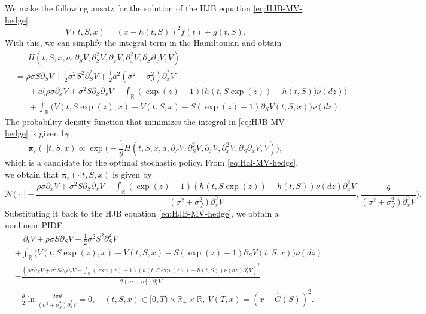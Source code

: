 \documentclass[11pt]{article}
\newcommand{\1}{\mathbbm{1}}
\newcommand{\bpi}{\boldsymbol{\pi}}
\begin{document}
We make the following ansatz for the solution of the HJB equation \eqref{eq:HJB-MV-hedge}:
\begin{equation}\label{eq:ansatz-MV-hedge}
	V(t,S,x)=(x-h(t,S))^2 f(t) + g(t,S).
\end{equation}
With this, we can simplify the integral term in the Hamiltonian and obtain
\begin{align}
	&\phantom{=~}H(t,S,x,a,\partial_SV,\partial_S^2V,\partial_xV,\partial_x^2V,\partial_S\partial_xV,V)\\
	&= \rho\sigma S \partial_SV + \frac{1}{2}\sigma^2S^2 \partial_S^2V + \frac{1}{2}a^2(\sigma^2+\sigma_J^2) \partial_x^2V \\
	&\phantom{=~}+ a\bigg(\rho\sigma \partial_xV + \sigma^2 S \partial_S\partial_xV - \int_{\mathbb{R}}(\exp(z)-1)\big(h(t,S\exp(z))-h(t,S)\big)\nu(dz)\bigg)\\
	&\phantom{=~}+\int_{\mathbb{R}} \big( V(t,S\exp(z),x) - V(t,S,x)- S(\exp(z)-1)\partial_SV(t,S,x)\big) \nu(dz).\label{eq:Hal-MV-hedge}
\end{align}
The probability density function that minimizes the integral in \eqref{eq:HJB-MV-hedge} is given by
\begin{equation}
	\bpi_c(\cdot|t,S,x)\propto \exp \bigg(-\frac{1}{\theta} H(t,S,x,a,\partial_SV,\partial_S^2V,\partial_xV,\partial_x^2V,\partial_S\partial_xV,V)\bigg),
\end{equation}
which is a candidate for the optimal stochastic policy.
From \eqref{eq:Hal-MV-hedge}, we obtain that $\bpi_c(\cdot|t,S,x)$ is given by
\begin{equation}
\mathcal{N}\bigg(\cdot\ \bigg| -\frac{\rho\sigma \partial_xV + \sigma^2 S \partial_S\partial_xV - \int_{\mathbb{R}}(\exp(z)-1)(h(t,S\exp(z))-h(t,S))\nu(dz)\partial_x^2V}{(\sigma^2+\sigma_J^2)\partial_x^2V}, \frac{\theta}{(\sigma^2+\sigma_J^2)\partial_x^2V}\bigg).
\end{equation}
Substituting it back to the HJB equation \eqref{eq:HJB-MV-hedge}, we obtain
a nonlinear PIDE
\begin{align}
	&\phantom{+~}\partial_tV + \rho\sigma S\partial_SV + \frac{1}{2}\sigma^2S^2\partial_S^2V\\
	&+ \int_{\mathbb{R}} \big( V(t,S\exp(z),x) - V(t,S,x)- S(\exp(z)-1)\partial_SV(t,S,x)\big) \nu(dz)\\
	&-\frac{(\rho\sigma \partial_XV + \sigma^2 S\partial_S\partial_xV-\int_{\mathbb{R}}(\exp(z)-1)(h(t,S\exp(z))-h(t,S))\nu(dz)\partial_x^2V)^2}{2(\sigma^2+\sigma_J^2)\partial_x^2V}\\
	&-\frac{\theta}{2}\ln\frac{2\pi\theta}{(\sigma^2+\sigma_J^2)\partial_x^2V}=0,\quad (t,S,x)\in[0,T)\times\mathbb{R}_+\times\mathbb{R},\ V(T,x)=(x-\hat{G}(S))^2.
\end{align}
\end{document}
